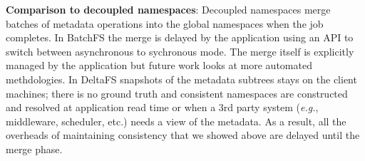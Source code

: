 
\noindent\textbf{Comparison to decoupled namespaces}: Decoupled namespaces
merge batches of metadata operations into the global namespaces when the job
completes.  In BatchFS the merge is delayed by the application using an API to
switch between asynchronous to sychronous mode. The merge itself is explicitly
managed by the application but future work looks at more automated
methdologies. In DeltaFS snapshots of the metadata subtrees stays on the client
machines; there is no ground truth and consistent namespaces are constructed
and resolved at application read time or when a 3rd party system ({\it e.g.},
middleware, scheduler, etc.) needs a view of the metadata. As a result, all the
overheads of maintaining consistency that we showed above are delayed until the
merge phase.
